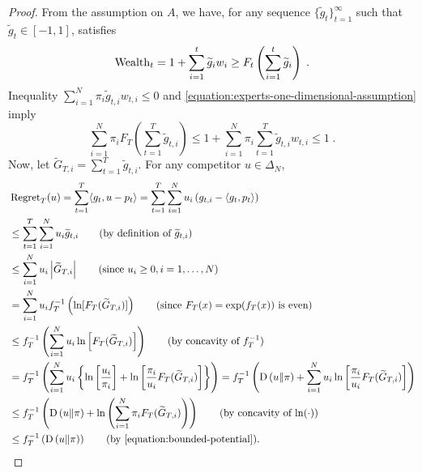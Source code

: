 \begin{proof}
From the assumption on $A$, we have, for any sequence
$\{\widetilde g_t\}_{t=1}^\infty$ such that $\widetilde g_t \in [-1,1]$, satisfies
\begin{equation}
\label{equation:experts-one-dimensional-assumption}
\operatorname{Wealth}_t = 1 + \sum_{i=1}^t \widetilde g_i w_i \ge F_t\left(\sum_{i=1}^t \widetilde g_i\right) \; .
\end{equation}
Inequality $\sum_{i=1}^N \pi_i \widetilde g_{t,i} w_{t,i} \le 0$ and \eqref{equation:experts-one-dimensional-assumption} imply
\begin{equation}
\label{equation:bounded-potential}
\sum_{i=1}^N  \pi_i F_T \left(\sum_{t=1}^T \widetilde g_{t,i} \right)
\le 1 + \sum_{i=1}^N \pi_i \sum_{t=1}^T  \widetilde g_{t,i} w_{t,i} \le 1 \; .
\end{equation}
Now, let $\widetilde G_{T,i} =
\sum_{t=1}^T \widetilde g_{t,i}$. For any competitor $u \in \Delta_N$,
\begingroup
\allowdisplaybreaks
\begin{align*}
\allowdisplaybreaks
&\Regret_T(u)
= \sum_{t=1}^T \langle g_t, u - p_t \rangle
= \sum_{t=1}^T \sum_{i=1}^N u_i \left(g_{t,i} - \langle g_t, p_t \rangle \right) \\
& \le \sum_{t=1}^T \sum_{i=1}^N u_i \widetilde g_{t,i} \qquad \text{(by definition of $\widetilde g_{t,i}$)} \\
& \le \sum_{i=1}^N u_i \left|\widetilde G_{T,i}\right| \qquad \text{(since $u_i \ge 0, i=1,\ldots, N$)}  \\
& = \sum_{i=1}^N u_i f_T^{-1}\left(\ln [F_T(\widetilde G_{T,i})] \right)  \qquad \text{(since $F_T(x) = \exp(f_T(x))$ is even)} \\
& \le f_T^{-1}\left(\sum_{i=1}^N u_i \ln \left[ F_T(\widetilde G_{T,i}) \right]\right) \qquad \text{(by concavity of $f_T^{-1}$)} \\
& = f_T^{-1}\left(\sum_{i=1}^N u_i \left\{\ln \left[\frac{u_i}{\pi_i}\right] +\ln \left[ \frac{\pi_i}{u_i} F_T(\widetilde G_{T,i}) \right] \right\} \right)
= f_T^{-1}\left(\KL{u}{\pi}+\sum_{i=1}^N u_i\ln \left[\frac{\pi_i}{u_i} F_T(\widetilde G_{T,i}) \right]\right) \\
& \le f_T^{-1}\left(\KL{u}{\pi}+\ln \left(\sum_{i=1}^N \pi_i F_T(\widetilde G_{T,i}) \right)\right) \qquad \text{(by concavity of $\ln(\cdot)$)} \\
& \le f_T^{-1}\left(\KL{u}{\pi}\right) \qquad \text{(by \eqref{equation:bounded-potential})}. \qedhere
\end{align*}
\endgroup
\end{proof}
